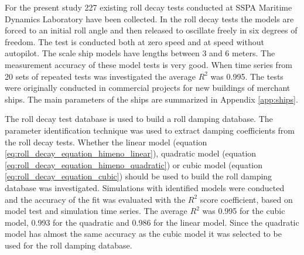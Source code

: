 For the present study 227 existing roll decay tests conducted at SSPA Maritime Dynamics Laboratory have been collected. In the roll decay tests the models are forced to an initial roll angle and then released to oscillate freely in six degrees of freedom. The test is conducted both at zero speed and at speed without autopilot. The scale ship models have lengths between 3 and 6 meters. The measurement accuracy of these model tests is very good. When time series from 20 sets of repeated tests was investigated the average $R^2$ was 0.995. The tests were originally conducted in commercial projects for new buildings of merchant ships. The main parameters of the ships are summarized in Appendix \ref{app:ships}. 

The roll decay test database is used to build a roll damping database. The parameter identification technique was used to extract damping coefficients from the roll decay tests. Whether the linear model (equation \ref{eq:roll_decay_equation_himeno_linear}), quadratic model (equation \ref{eq:roll_decay_equation_himeno_quadratic}) or cubic model (equation \ref{eq:roll_decay_equation_cubic}) should be used to build the roll damping database was investigated. Simulations with identified models were conducted and the accuracy of the fit was evaluated with the $R^2$ score coefficient, based on model test and simulation time series.
The average $R^2$ was 0.995 for the cubic model, 0.993 for the quadratic and 0.986 for the linear model. Since the quadratic model has almost the same accuracy as the cubic model it was selected to be used for the roll damping database.
